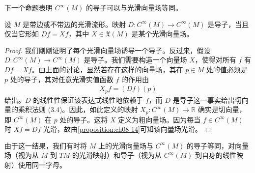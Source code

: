 \documentclass[../../main.tex]{subfiles}
\begin{document}
下一个命题表明 $C^\infty(M)$ 的导子可以与光滑向量场等同。

\begin{proposition}\label{proposition:ch08-15}
设 $M$ 是带边或不带边的光滑流形。映射 $D\colon C^\infty(M)\to C^\infty(M)$ 是导子，当且仅当它形如 $Df=Xf$，其中 $X\in\mathfrak{X}(M)$ 是某个光滑向量场。
\end{proposition}

\begin{proof}
我们刚刚证明了每个光滑向量场诱导一个导子。反过来，假设 $D\colon C^\infty(M)\to C^\infty(M)$ 是导子。我们需要构造一个向量场 $X$，使得对所有 $f$ 有 $Df=Xf$。由上面的讨论，显然若存在这样的向量场，其在 $p\in M$ 处的值必须是 $p$ 处的导子，其对任意光滑实值函数 $f$ 的作用由
\begin{align*}
X_pf=(Df)(p)
\end{align*}
给出。$D$ 的线性性保证该表达式线性地依赖于 $f$，而 $D$ 是导子这一事实给出切向量的乘积法则 (3.4)。因此，如此定义的映射 $X_p\colon C^\infty(M)\to\mathbb{R}$ 确实是切向量，即 $C^\infty(M)$ 在 $p$ 处的导子。这将 $X$ 定义为粗向量场。因为每当 $f\in C^\infty(M)$ 时 $Xf=Df$ 光滑，故由\cref{proposition:ch08-14}可知该向量场光滑。
\end{proof}

由于这一结果，我们有时将 $M$ 上的光滑向量场与 $C^\infty(M)$ 的导子等同，对向量场（视为从 $M$ 到 $TM$ 的光滑映射）和导子（视为从 $C^\infty(M)$ 到自身的线性映射）使用同一字母。
\end{document}
